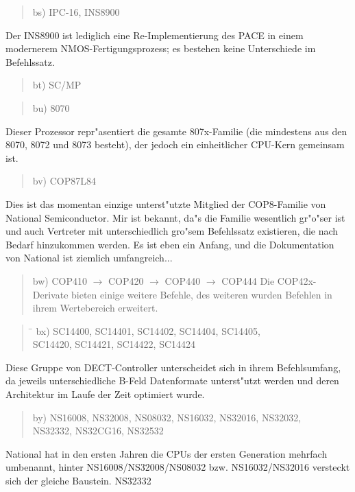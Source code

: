 \documentclass[12pt,a4paper,twoside]{report}
\begin{document}
\begin{quote}
bs) IPC-16, INS8900
\end{quote}
Der INS8900 ist lediglich eine Re-Implementierung des PACE in
einem modernerem NMOS-Fertigungsprozess; es bestehen keine
Unterschiede im Befehlssatz.
\begin{quote}
bt) SC/MP
\end{quote}
\begin{quote}
bu) 8070
\end{quote}
Dieser Prozessor repr"asentiert die gesamte 807x-Familie (die mindestens
aus den 8070, 8072 und 8073 besteht), der jedoch ein einheitlicher
CPU-Kern gemeinsam ist.
\begin{quote}
bv) COP87L84
\end{quote}
Dies ist das momentan einzige unterst"utzte Mitglied der COP8-Familie
von National Semiconductor.  Mir ist bekannt, da"s die Familie
wesentlich gr"o"ser ist und auch Vertreter mit unterschiedlich gro"sem
Befehlssatz existieren, die nach Bedarf hinzukommen werden.  Es ist eben
ein Anfang, und die Dokumentation von National ist ziemlich umfangreich...
\begin{quote}
bw) COP410 $\rightarrow$ COP420 $\rightarrow$ COP440 $\rightarrow$ COP444
Die COP42x-Derivate bieten einige weitere Befehle, des weiteren wurden
Befehlen in ihrem Wertebereich erweitert.
\end{quote}
\begin{quote}
\begin{tabbing}
\hspace{0.7cm} \= \kill
bx) \> SC14400, SC14401, SC14402, SC14404, SC14405, \\
    \> SC14420, SC14421, SC14422, SC14424 \\
\end{tabbing}
\end{quote}
Diese Gruppe von DECT-Controller unterscheidet sich in ihrem
Befehlsumfang, da jeweils unterschiedliche B-Feld Datenformate
unterst"utzt werden und deren Architektur im Laufe der Zeit optimiert
wurde.
\begin{quote}
by) NS16008, NS32008, NS08032, NS16032, NS32016, NS32032, \\
    NS32332, NS32CG16, NS32532
\end{quote}
National hat in den ersten Jahren die CPUs der ersten Generation
mehrfach umbenannt, hinter NS16008/NS32008/NS08032 bzw.
NS16032/NS32016 versteckt sich der gleiche Baustein.  NS32332
\end{document}
